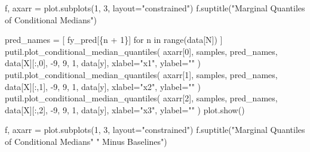 \documentclass[
  letterpaper,
  DIV=11,
  numbers=noendperiod]{scrartcl}
\newenvironment{Shaded}{\begin{snugshade}}{\end{snugshade}}
\newcommand{\BuiltInTok}[1]{\textcolor[rgb]{0.00,0.23,0.31}{#1}}
\newcommand{\ControlFlowTok}[1]{\textcolor[rgb]{0.00,0.23,0.31}{#1}}
\newcommand{\DecValTok}[1]{\textcolor[rgb]{0.68,0.00,0.00}{#1}}
\newcommand{\KeywordTok}[1]{\textcolor[rgb]{0.00,0.23,0.31}{#1}}
\newcommand{\NormalTok}[1]{\textcolor[rgb]{0.00,0.23,0.31}{#1}}
\newcommand{\OperatorTok}[1]{\textcolor[rgb]{0.37,0.37,0.37}{#1}}
\newcommand{\SpecialCharTok}[1]{\textcolor[rgb]{0.37,0.37,0.37}{#1}}
\newcommand{\SpecialStringTok}[1]{\textcolor[rgb]{0.13,0.47,0.30}{#1}}
\newcommand{\StringTok}[1]{\textcolor[rgb]{0.13,0.47,0.30}{#1}}
\begin{document}
\begin{Shaded}
\begin{Highlighting}[]
\NormalTok{f, axarr }\OperatorTok{=}\NormalTok{ plot.subplots(}\DecValTok{1}\NormalTok{, }\DecValTok{3}\NormalTok{, layout}\OperatorTok{=}\StringTok{"constrained"}\NormalTok{)}
\NormalTok{f.suptitle(}\StringTok{"Marginal Quantiles of Conditional Medians"}\NormalTok{)}

\NormalTok{pred\_names }\OperatorTok{=}\NormalTok{ [ }\SpecialStringTok{f\textquotesingle{}y\_pred[}\SpecialCharTok{\{}\NormalTok{n }\OperatorTok{+} \DecValTok{1}\SpecialCharTok{\}}\SpecialStringTok{]\textquotesingle{}}
              \ControlFlowTok{for}\NormalTok{ n }\KeywordTok{in} \BuiltInTok{range}\NormalTok{(data[}\StringTok{\textquotesingle{}N\textquotesingle{}}\NormalTok{]) ]}
\NormalTok{putil.plot\_conditional\_median\_quantiles(}
\NormalTok{  axarr[}\DecValTok{0}\NormalTok{], samples, pred\_names,}
\NormalTok{  data[}\StringTok{\textquotesingle{}X\textquotesingle{}}\NormalTok{][:,}\DecValTok{0}\NormalTok{], }\OperatorTok{{-}}\DecValTok{9}\NormalTok{, }\DecValTok{9}\NormalTok{, }\DecValTok{1}\NormalTok{,}
\NormalTok{  data[}\StringTok{\textquotesingle{}y\textquotesingle{}}\NormalTok{], xlabel}\OperatorTok{=}\StringTok{"x1"}\NormalTok{, ylabel}\OperatorTok{=}\StringTok{""}
\NormalTok{)}
\NormalTok{putil.plot\_conditional\_median\_quantiles(}
\NormalTok{  axarr[}\DecValTok{1}\NormalTok{], samples, pred\_names,}
\NormalTok{  data[}\StringTok{\textquotesingle{}X\textquotesingle{}}\NormalTok{][:,}\DecValTok{1}\NormalTok{], }\OperatorTok{{-}}\DecValTok{9}\NormalTok{, }\DecValTok{9}\NormalTok{, }\DecValTok{1}\NormalTok{,}
\NormalTok{  data[}\StringTok{\textquotesingle{}y\textquotesingle{}}\NormalTok{], xlabel}\OperatorTok{=}\StringTok{"x2"}\NormalTok{, ylabel}\OperatorTok{=}\StringTok{""}
\NormalTok{)}
\NormalTok{putil.plot\_conditional\_median\_quantiles(}
\NormalTok{  axarr[}\DecValTok{2}\NormalTok{], samples, pred\_names,}
\NormalTok{  data[}\StringTok{\textquotesingle{}X\textquotesingle{}}\NormalTok{][:,}\DecValTok{2}\NormalTok{], }\OperatorTok{{-}}\DecValTok{9}\NormalTok{, }\DecValTok{9}\NormalTok{, }\DecValTok{1}\NormalTok{,}
\NormalTok{  data[}\StringTok{\textquotesingle{}y\textquotesingle{}}\NormalTok{], xlabel}\OperatorTok{=}\StringTok{"x3"}\NormalTok{, ylabel}\OperatorTok{=}\StringTok{""}
\NormalTok{)}
\NormalTok{plot.show()}

\NormalTok{f, axarr }\OperatorTok{=}\NormalTok{ plot.subplots(}\DecValTok{1}\NormalTok{, }\DecValTok{3}\NormalTok{, layout}\OperatorTok{=}\StringTok{"constrained"}\NormalTok{)}
\NormalTok{f.suptitle(}\StringTok{"Marginal Quantiles of Conditional Medians"}
           \StringTok{" Minus Baselines"}\NormalTok{)}


\end{Highlighting}
\end{Shaded}
\end{document}
